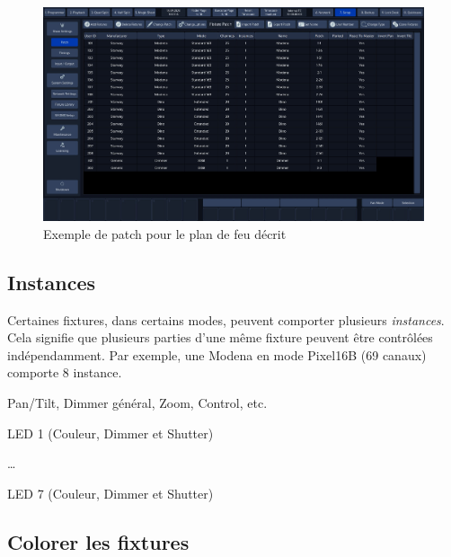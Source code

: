\begin{figure}[H]
    \centering
    \includegraphics[width=\textwidth]{3 - Encoder la Chimp/Images/patch.jpg}
    \caption{Exemple de patch pour le plan de feu décrit}
    \label{fig:exemple_patch}
\end{figure}

\subsection{Instances}
\label{subsec:prep_instances}

Certaines fixtures, dans certains modes, peuvent comporter plusieurs \textit{instances}. Cela signifie que plusieurs parties d'une même fixture peuvent être contrôlées indépendamment.
\newline
Par exemple, une Modena en mode Pixel16B (69 canaux) comporte 8 instance.
\begin{list}{-}{}
    \item Pan/Tilt, Dimmer général, Zoom, Control, etc.
    \item LED 1 (Couleur, Dimmer et Shutter)
    \item \dots
    \item LED 7 (Couleur, Dimmer et Shutter)
\end{list}

\subsection{Colorer les fixtures}
\label{subsec:prep_colorer}

